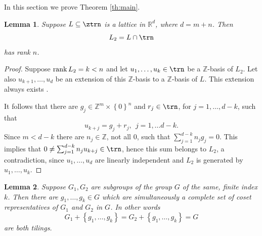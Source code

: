 \documentclass[12pt,a4paper,oneside]{amsart}
\theoremstyle{plain}
\newtheorem{lemma}{Lemma}
\theoremstyle{definition}
\newcommand{\Set}[1]{{\left\{{#1}\right\}}}
\newcommand{\RR}{{\mathbb R}}
\newcommand{\ZZ}{{\mathbb Z}}
\newcommand{\rank}{{\rm rank\,}}
\newcounter{rem}
\begin{document}
In this section we prove Theorem \ref{th:main}.

\begin{lemma}\label{lm:ranks}
Suppose $L \subseteq \ztrn$ is a lattice in $\RR^d$, where $d=m+n$. Then
$$
L_2 = L \cap \trn
$$
has rank $n$.
\end{lemma}

\begin{proof}
Suppose $\rank L_2 = k < n$ and let $u_1, \ldots, u_k \in \trn$ be a $\ZZ$-basis of $L_2$. Let also $u_{k+1},\ldots,u_d$ be an extension of this $\ZZ$-basis to a $\ZZ$-basis of $L$. This extension always exists \cite[Corollary 3, p.\ 14]{cassels1996introduction}.

It follows that there are $g_j \in \ZZ^m\times\Set{0}^n$ and $r_j \in \trn$, for $j=1,\ldots,d-k$, such that
$$
u_{k+j} = g_j + r_j,\ \ j=1,\ldots d-k.
$$
Since $m<d-k$ there are $n_j \in \ZZ$, not all $0$, such that $\sum_{j=1}^{d-k} n_j  g_j = 0$. This implies that $0 \neq \sum_{j=1}^{d-k} n_j u_{k+j} \in \trn$, hence this sum belongs to $L_2$, a contradiction, since $u_1,\ldots,u_d$ are linearly independent and $L_2$ is generated by $u_1, \ldots, u_k$.

\end{proof}

\begin{lemma}{\cite[Theorem 4.3]{ore1958}}\label{lm:two}
Suppose $G_1, G_2$ are subgroups of the group $G$ of the same, finite index $k$. Then there are $g_1, \ldots, g_k \in G$ which are simultaneously a complete set of coset representatives of $G_1$ and $G_2$ in $G$. In other words
$$
G_1 + \Set{g_1, \ldots, g_k} = G_2 + \Set{g_1, \ldots, g_k} = G
$$
are both tilings. 
\end{lemma}



\end{document}
